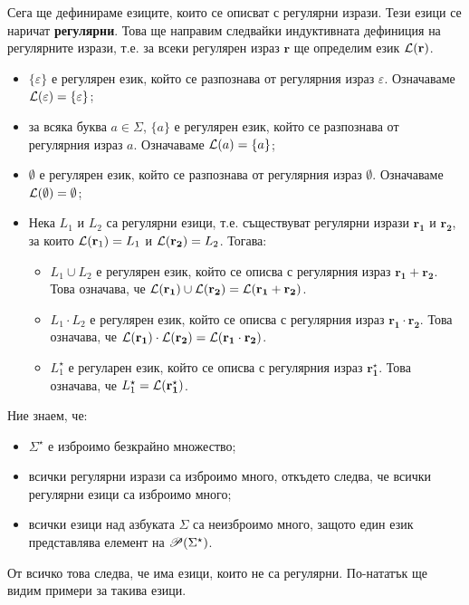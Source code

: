 Сега ще дефинираме езиците, които се описват с регулярни изрази.
Тези езици се наричат {\bf регулярни}.
Това ще направим следвайки индуктивната дефиниция на регулярните изрази,
т.е. за всеки регулярен израз $\mathbf{r}$ ще определим език $\mathcal{L}(\mathbf{r})$.
\begin{itemize}
\item
  $\{\varepsilon\}$ е регулярен език,
  който се разпознава от регулярния израз $\varepsilon$.
  Означаваме $\mathcal{L}(\varepsilon) = \{\varepsilon\}$;
\item
  за всяка буква $a \in \Sigma$, $\{a\}$ е регулярен език,
  който се разпознава от регулярния израз $a$.
  Означаваме $\mathcal{L}(a) = \{a\}$;
\item
  $\emptyset$ е регулярен език,
  който се разпознава от регулярния израз $\emptyset$. Означаваме $\mathcal{L}(\emptyset) = \emptyset$;
\item
  Нека $L_1$ и $L_2$ са регулярни езици, т.е. съществуват регулярни изрази $\mathbf{r_1}$
  и $\mathbf{r_2}$, за които $\mathcal{L}(\mathbf{r}_1) = L_1$ и $\mathcal{L}(\mathbf{r_2}) = L_2$.
  Тогава:
  \begin{itemize}
  \item 
    $L_1 \cup L_2$ е регулярен език, който се описва с регулярния израз $\mathbf{r_1 + r_2}$.
    Това означава, че $\mathcal{L}(\mathbf{r_1}) \cup \mathcal{L}(\mathbf{r_2}) = \mathcal{L}(\mathbf{r_1+r_2})$.
  \item
    $L_1 \cdot L_2$ е регулярен език, който се описва с регулярния израз $\mathbf{r_1 \cdot r_2}$.
    Това означава, че $\mathcal{L}(\mathbf{r_1}) \cdot \mathcal{L}(\mathbf{r_2}) = \mathcal{L}(\mathbf{r_1 \cdot r_2})$.
  \item
    $L^\star_1$ е регуларен език, който се описва с регулярния израз $\mathbf{r^\star_1}$.
    Това означава, че $L^\star_1 = \mathcal{L}(\mathbf{r^\star_1})$.
  \end{itemize}
\end{itemize}

\begin{remark}
  Ние знаем, че:
  \begin{itemize}
  \item 
    $\Sigma^\star$ е изброимо безкрайно множество;
  \item
    всички регулярни изрази са изброимо много, откъдето следва, че всички регулярни езици са изброимо много;
  \item
    всички езици над азбуката $\Sigma$ са неизброимо много, защото един език представлява елемент на $\mathscr{P}(\Sigma^\star)$.
  \end{itemize}
  От всичко това следва, че има езици, които не са регулярни.
  По-нататък ще видим примери за такива езици.
\end{remark}

